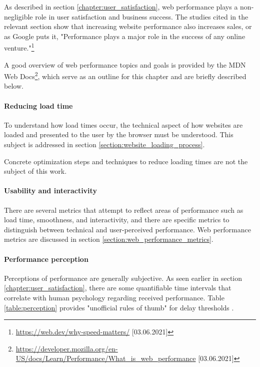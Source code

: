 
As described in section \ref{chapter:user_satisfaction}, web performance plays a non-negligible role in user satisfaction and business success.
The studies cited in the relevant section show that increasing website performance also increases sales, or as Google puts it, "Performance plays a major role in the success of any online venture."\footnote{\url{https://web.dev/why-speed-matters/} [03.06.2021]}

A good overview of web performance topics and goals is provided by the MDN Web Docs\footnote{\url{https://developer.mozilla.org/en-US/docs/Learn/Performance/What_is_web_performance} [03.06.2021]}, which serve as an outline for this chapter and are briefly described below.


\paragraph{Reducing load time}

To understand how load times occur, the technical aspect of how websites are loaded and presented to the user by the browser must be understood.
This subject is addressed in section \ref{section:website_loading_process}.

Concrete optimization steps and techniques to reduce loading times are not the subject of this work.


\paragraph{Usability and interactivity}

There are several metrics that attempt to reflect areas of performance such as load time, smoothness, and interactivity, and there are specific metrics to distinguish between technical and user-perceived performance.
Web performance metrics are discussed in section \ref{section:web_performance_metrics}.


\paragraph{Performance perception}

Perceptions of performance are generally subjective.
As seen earlier in section \ref{chapter:user_satisfaction}, there are some quantifiable time intervals that correlate with human psychology regarding received performance.
Table \ref{table:perception} provides "unofficial rules of thumb" for delay thresholds \cite{2013Grigorik}.

